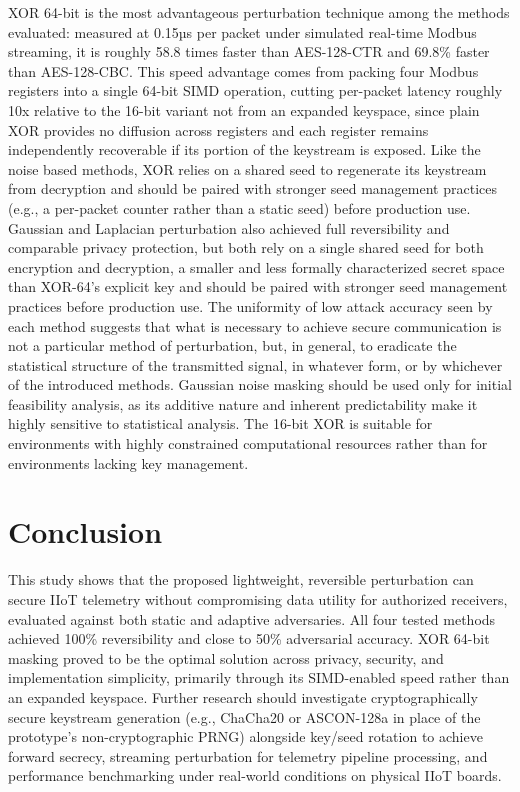 \documentclass[conference]{IEEEtran}
\begin{document}
XOR 64-bit is the most advantageous perturbation technique among the methods evaluated: measured at 0.15µs per packet under simulated real-time Modbus streaming, it is roughly 58.8 times faster than AES-128-CTR and 69.8\% faster than AES-128-CBC. This speed advantage comes from packing four Modbus registers into a single 64-bit SIMD operation, cutting per-packet latency roughly 10x relative to the 16-bit variant not from an expanded keyspace, since plain XOR provides no diffusion across registers and each register remains independently recoverable if its portion of the keystream is exposed. Like the noise based methods, XOR relies on a shared seed to regenerate its keystream from decryption and should be paired with stronger seed management practices (e.g., a per-packet counter rather than a static seed) before production use. Gaussian and Laplacian perturbation also achieved full reversibility and comparable privacy protection, but both rely on a single shared seed for both encryption and decryption, a smaller and less formally characterized secret space than XOR-64’s explicit key and should be paired with stronger seed management practices before production use. The uniformity of low attack accuracy seen by each method suggests that what is necessary to achieve secure communication is not a particular method of perturbation, but, in general, to eradicate the statistical structure of the transmitted signal, in whatever form, or by whichever of the introduced methods. Gaussian noise masking should be used only for initial feasibility analysis, as its additive nature and inherent predictability make it highly sensitive to statistical analysis. The 16-bit XOR is suitable for environments with highly constrained computational resources rather than for environments lacking key management.

\section{Conclusion}

This study shows that the proposed lightweight, reversible perturbation can secure IIoT telemetry without compromising data utility for authorized receivers, evaluated against both static and adaptive adversaries. All four tested methods achieved 100\% reversibility and close to 50\% adversarial accuracy. XOR 64-bit masking proved to be the optimal solution across privacy, security, and implementation simplicity, primarily through its SIMD-enabled speed rather than an expanded keyspace. Further research should investigate cryptographically secure keystream generation (e.g., ChaCha20 or ASCON-128a in place of the prototype’s non-cryptographic PRNG) alongside key/seed rotation to achieve forward secrecy, streaming perturbation for telemetry pipeline processing, and performance benchmarking under real-world conditions on physical IIoT boards. 
\end{document}
